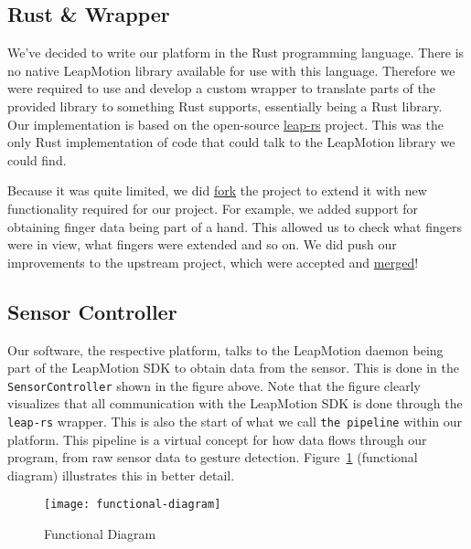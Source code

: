 \documentclass{standalone}
\begin{document}
  \subsection{Rust \& Wrapper}
  We've decided to write our platform in the Rust programming language. There is
  no native LeapMotion library available for use with this language. Therefore
  we were required to use and develop a custom wrapper to translate parts of the
  provided library to something Rust supports, essentially being a Rust library.
  Our implementation is based on the open-source
  \href{https://github.com/panicbit/leap-rs}{leap-rs} project. This was the only
  Rust implementation of code that could talk to the LeapMotion library we could
  find.

  Because it was quite limited, we did
  \href{https://github.com/timvisee/leap-rs}{fork}
  the project to extend it with new functionality required for our project.
  For example, we added support for obtaining finger data being part of a hand.
  This allowed us to check what fingers were in view, what fingers were extended
  and so on.
  We did push our improvements to the upstream project, which were accepted and
  \href{https://github.com/panicbit/leap-rs/pulls?utf8=%E2%9C%93&q=is%3Apr+is%3Aclosed+author%3Atimvisee}{merged}!

  \subsection{Sensor Controller}
  Our software, the respective platform, talks to the LeapMotion daemon being
  part of the LeapMotion SDK to obtain data from the sensor. This is done in the
  \verb_SensorController_ shown in the figure above. Note that the figure
  clearly visualizes that all communication with the LeapMotion SDK is done
  through the \verb_leap-rs_ wrapper. This is also the start of what we call
  \verb_the pipeline_ within our platform. This pipeline is a virtual concept
  for how data flows through our program, from raw sensor data to gesture
  detection.
  Figure~\ref{fig:pipeline-diagram} (functional diagram) illustrates this in
  better detail.

  \begin{figure}[h]
    \centering
      \texttt{[image: functional-diagram]}
    \caption{Functional Diagram}
    \label{fig:pipeline-diagram}
  \end{figure}
\end{document}
